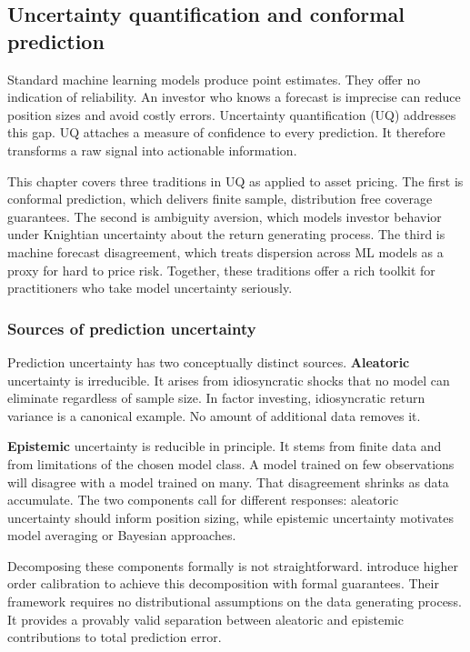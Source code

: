 \subsection{Uncertainty quantification and conformal prediction}

Standard machine learning models produce point estimates. They offer no indication of reliability. An investor who knows a forecast is imprecise can reduce position sizes and avoid costly errors. Uncertainty quantification (UQ) addresses this gap. UQ attaches a measure of confidence to every prediction. It therefore transforms a raw signal into actionable information.

This chapter covers three traditions in UQ as applied to asset pricing. The first is conformal prediction, which delivers finite sample, distribution free coverage guarantees. The second is ambiguity aversion, which models investor behavior under Knightian uncertainty about the return generating process. The third is machine forecast disagreement, which treats dispersion across ML models as a proxy for hard to price risk. Together, these traditions offer a rich toolkit for practitioners who take model uncertainty seriously.

\subsubsection{Sources of prediction uncertainty}\label{sec_uncertainty_types}

Prediction uncertainty has two conceptually distinct sources. \textbf{Aleatoric} uncertainty is irreducible. It arises from idiosyncratic shocks that no model can eliminate regardless of sample size. In factor investing, idiosyncratic return variance is a canonical example. No amount of additional data removes it.

\textbf{Epistemic} uncertainty is reducible in principle. It stems from finite data and from limitations of the chosen model class. A model trained on few observations will disagree with a model trained on many. That disagreement shrinks as data accumulate. The two components call for different responses: aleatoric uncertainty should inform position sizing, while epistemic uncertainty motivates model averaging or Bayesian approaches.

Decomposing these components formally is not straightforward. \cite{ahdritz2024calibration} introduce higher order calibration to achieve this decomposition with formal guarantees. Their framework requires no distributional assumptions on the data generating process. It provides a provably valid separation between aleatoric and epistemic contributions to total prediction error.

